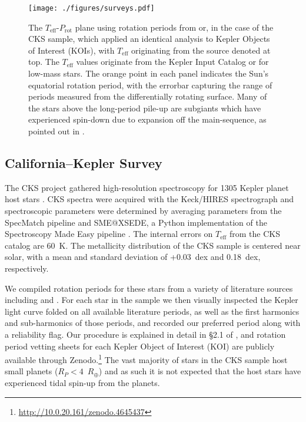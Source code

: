 \documentclass[linenumbers,tighten,trackchanges,twocolumn]{aastex631}
\newcommand{\teff}{\ensuremath{T_{\mathrm{eff}}}\xspace}
\newcommand{\rearth}{$R_\oplus$\xspace}
\newcommand{\prot}{\ensuremath{P_\mathrm{rot}}\xspace}
\begin{document}
\begin{figure*}
    \centering
    \texttt{[image: ./figures/surveys.pdf]}
    \caption{The \teff-\prot plane using rotation periods from \citet{McQuillan2014} or, in the case of the CKS sample, \citet{McQuillan2013} which applied an identical analysis to Kepler Objects of Interest (KOIs), with \teff originating from the source denoted at top. The \citet{McQuillan2014} \teff values originate from the Kepler Input Catalog \citep[KIC,][]{Brown2011} or \citet{Dressing2013} for low-mass stars. The orange point in each panel indicates the Sun's equatorial rotation period, with the errorbar capturing the range of periods measured from the differentially rotating surface. Many of the stars above the long-period pile-up are subgiants which have experienced spin-down due to expansion off the main-sequence, as pointed out in \citet{vanSaders2019}.}
    \label{fig:surveys}
\end{figure*}

\subsection{California--Kepler Survey} \label{subsec:cks}
The CKS project gathered high-resolution spectroscopy for 1305 Kepler planet host stars \citep{Petigura2017}. CKS spectra were acquired with the Keck/HIRES spectrograph \citep{Vogt1994} and spectroscopic parameters were determined by averaging parameters from the SpecMatch pipeline \citep{Petigura2015} and SME@XSEDE, a Python implementation of the Spectroscopy Made Easy pipeline \citep{Valenti1996}. The internal errors on \teff from the CKS catalog are 60~K. The metallicity distribution of the CKS sample is centered near solar, with a mean and standard deviation of +0.03~dex and 0.18~dex, respectively.

We compiled rotation periods for these stars from a variety of literature sources including \citet{McQuillan2013, Mazeh2015} and \citet{Angus2018}. For each star in the sample we then visually inspected the Kepler light curve folded on all available literature periods, as well as the first harmonics and sub-harmonics of those periods, and recorded our preferred period along with a reliability flag. Our procedure is explained in detail in \S2.1 of \citet{David2021}, and rotation period vetting sheets for each Kepler Object of Interest (KOI) are publicly available through Zenodo.\footnote{\url{http://10.0.20.161/zenodo.4645437}} The vast majority of stars in the CKS sample host small planets ($R_P < 4$~\rearth) and as such it is not expected that the host stars have experienced tidal spin-up from the planets.
\end{document}
